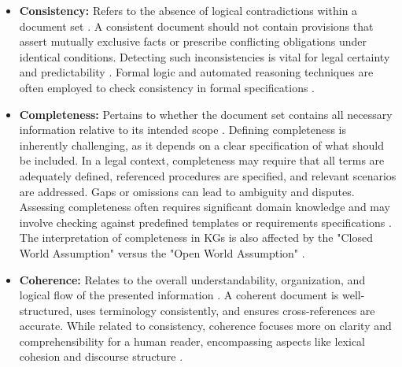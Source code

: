 \begin{itemize}
    \item \textbf{Consistency:} Refers to the absence of logical contradictions within a document set \parencite{RefWorks:RefID:10-zowghi2003interplay, RefWorks:RefID:21-heitmeyer1996automated, RefWorks:RefID:25-nentwich2005managing, RefWorks:RefID:26-egyed2006instant, RefWorks:RefID:27-tröls2022instant, RefWorks:RefID:28-yang2024fizz, RefWorks:RefID:30-guo2023joint}. A consistent document should not contain provisions that assert mutually exclusive facts or prescribe conflicting obligations under identical conditions. Detecting such inconsistencies is vital for legal certainty and predictability \parencite{RefWorks:RefID:52-donelson2019legal, RefWorks:RefID:53-duck-mayr2022explaining, RefWorks:RefID:54-rossi2016inconsistent}. Formal logic and automated reasoning techniques are often employed to check consistency in formal specifications \parencite{RefWorks:RefID:21-heitmeyer1996automated, RefWorks:RefID:24-brucker2019ontologies}.

    \item \textbf{Completeness:} Pertains to whether the document set contains all necessary information relative to its intended scope \parencite{RefWorks:RefID:10-zowghi2003interplay}. Defining completeness is inherently challenging, as it depends on a clear specification of what should be included. In a legal context, completeness may require that all terms are adequately defined, referenced procedures are specified, and relevant scenarios are addressed. Gaps or omissions can lead to ambiguity and disputes. Assessing completeness often requires significant domain knowledge and may involve checking against predefined templates or requirements specifications \parencite{RefWorks:RefID:10-zowghi2003interplay, RefWorks:RefID:29-umar2024advances}. The interpretation of completeness in KGs is also affected by the "Closed World Assumption" versus the "Open World Assumption" \parencite{RefWorks:RefID:148-reiter1978on, RefWorks:RefID:110-hitzler2009foundations}.

    \item \textbf{Coherence:} Relates to the overall understandability, organization, and logical flow of the presented information \parencite{RefWorks:RefID:44-wang2014short, RefWorks:RefID:14-shen2021evaluating}. A coherent document is well-structured, uses terminology consistently, and ensures cross-references are accurate. While related to consistency, coherence focuses more on clarity and comprehensibility for a human reader, encompassing aspects like lexical cohesion and discourse structure \parencite{RefWorks:RefID:44-wang2014short}.
\end{itemize}

